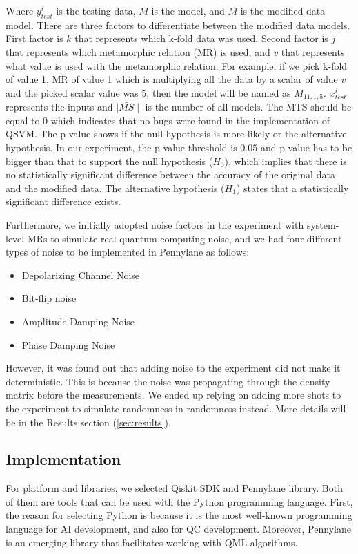 \documentclass[12pt,a4paper]{article}
\begin{document}
	Where $y^i_{test}$ is the testing data, $M$ is the model, and $\bar{M}$ is the modified data model. There are three factors to differentiate between the modified data models. First factor is $k$ that represents which k-fold data was used. Second factor is $j$ that represents which metamorphic relation (MR) is used, and $v$ that represents what value is used with the metamorphic relation. For example, if we pick k-fold of value 1, MR of value 1 which is multiplying all the data by a scalar of value $v$ and the picked scalar value was 5, then the model will be named as $M_{11,1,5}$. $x^i_{test}$ represents the inputs and $\mid \bar{MS} \mid$ is the number of all models. The MTS should be equal to 0 which indicates that no bugs were found in the implementation of QSVM. The p-value shows if the null hypothesis is more likely or the alternative hypothesis. In our experiment, the p-value threshold is $0.05$ and p-value has to be bigger than that to support the null hypothesis ($H_0$), which implies that there is no statistically significant difference between the accuracy of the original data and the modified data. The alternative hypothesis ($H_1$) states that a statistically significant difference exists.
	
	Furthermore, we initially adopted noise factors in the experiment with system-level MRs to simulate real quantum computing noise, and we had four different types of noise to be implemented in Pennylane as follows:
	\begin{itemize}
		\item Depolarizing Channel Noise
		\item Bit-flip noise
		\item Amplitude Damping Noise
		\item Phase Damping Noise
	\end{itemize}
	
	However, it was found out that adding noise to the experiment did not make it deterministic. This is because the noise was propagating through the density matrix before the measurements. We ended up relying on adding more shots to the experiment to simulate randomness in randomness instead. More details will be in the Results section (\ref{sec:results}).
	
	\subsection{Implementation}
	\label{sec:implementation}
	
	For platform and libraries, we selected Qiskit SDK and Pennylane library. Both of them are tools that can be used with the Python programming language. First, the reason for selecting Python is because it is the most well-known programming language for AI development, and also for QC development. Moreover, Pennylane is an emerging library that facilitates working with QML algorithms.
	
\end{document}
